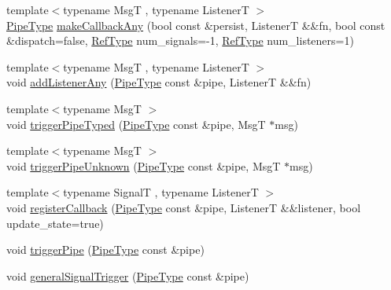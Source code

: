\begin{DoxyCompactItemize}
\item 
{\footnotesize template$<$typename MsgT , typename ListenerT $>$ }\\\hyperlink{namespacevt_ac9852acda74d1896f48f406cd72c7bd3}{Pipe\+Type} \hyperlink{structvt_1_1pipe_1_1_pipe_manager_base_a6fec17887d5cae03c513088ccb4ce3db}{make\+Callback\+Any} (bool const \&persist, ListenerT \&\&fn, bool const \&dispatch=false, \hyperlink{namespacevt_a9b39ce9494bb04674d0d5b895a5aa50f}{Ref\+Type} num\+\_\+signals=-\/1, \hyperlink{namespacevt_a9b39ce9494bb04674d0d5b895a5aa50f}{Ref\+Type} num\+\_\+listeners=1)
\item 
{\footnotesize template$<$typename MsgT , typename ListenerT $>$ }\\void \hyperlink{structvt_1_1pipe_1_1_pipe_manager_base_aee28bc7a33e3a0b796aa8fcdd6f72bd9}{add\+Listener\+Any} (\hyperlink{namespacevt_ac9852acda74d1896f48f406cd72c7bd3}{Pipe\+Type} const \&pipe, ListenerT \&\&fn)
\item 
{\footnotesize template$<$typename MsgT $>$ }\\void \hyperlink{structvt_1_1pipe_1_1_pipe_manager_base_a34492ef027a92525ca5acc4e86b360ce}{trigger\+Pipe\+Typed} (\hyperlink{namespacevt_ac9852acda74d1896f48f406cd72c7bd3}{Pipe\+Type} const \&pipe, MsgT $\ast$msg)
\item 
{\footnotesize template$<$typename MsgT $>$ }\\void \hyperlink{structvt_1_1pipe_1_1_pipe_manager_base_ad21185d07e9c3a0206d3d5a791f668a3}{trigger\+Pipe\+Unknown} (\hyperlink{namespacevt_ac9852acda74d1896f48f406cd72c7bd3}{Pipe\+Type} const \&pipe, MsgT $\ast$msg)
\item 
{\footnotesize template$<$typename SignalT , typename ListenerT $>$ }\\void \hyperlink{structvt_1_1pipe_1_1_pipe_manager_base_a27f1aea903f8e05655eb84ae1474c729}{register\+Callback} (\hyperlink{namespacevt_ac9852acda74d1896f48f406cd72c7bd3}{Pipe\+Type} const \&pipe, ListenerT \&\&listener, bool update\+\_\+state=true)
\item 
void \hyperlink{structvt_1_1pipe_1_1_pipe_manager_base_a32f82a02196fe42e98ae3b628b73ae6d}{trigger\+Pipe} (\hyperlink{namespacevt_ac9852acda74d1896f48f406cd72c7bd3}{Pipe\+Type} const \&pipe)
\item 
void \hyperlink{structvt_1_1pipe_1_1_pipe_manager_base_a27d24548529db938aeeb6fe11af985a1}{general\+Signal\+Trigger} (\hyperlink{namespacevt_ac9852acda74d1896f48f406cd72c7bd3}{Pipe\+Type} const \&pipe)

\end{DoxyCompactItemize}
